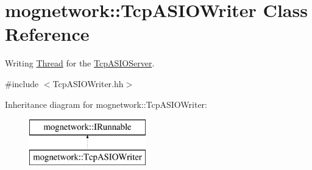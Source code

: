\hypertarget{classmognetwork_1_1_tcp_a_s_i_o_writer}{\section{mognetwork\-:\-:Tcp\-A\-S\-I\-O\-Writer Class Reference}
\label{classmognetwork_1_1_tcp_a_s_i_o_writer}
}


Writing \hyperlink{classmognetwork_1_1_thread}{Thread} for the \hyperlink{classmognetwork_1_1_tcp_a_s_i_o_server}{Tcp\-A\-S\-I\-O\-Server}.  




{\ttfamily \#include $<$Tcp\-A\-S\-I\-O\-Writer.\-hh$>$}

Inheritance diagram for mognetwork\-:\-:Tcp\-A\-S\-I\-O\-Writer\-:\begin{figure}[H]
\begin{center}
\leavevmode
\includegraphics[height=2.000000cm]{classmognetwork_1_1_tcp_a_s_i_o_writer}
\end{center}
\end{figure}
